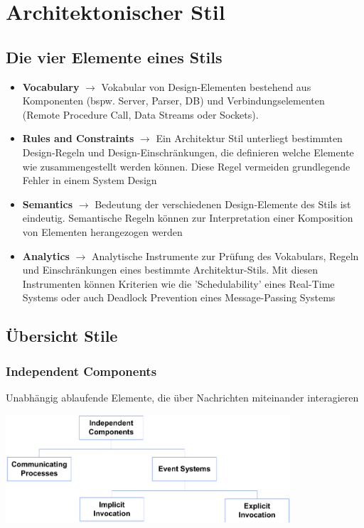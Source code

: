 \documentclass{report}
\newenvironment{Figure}
	{\par\medskip\noindent\minipage{\linewidth}}
	{\endminipage\par\medskip}
\theoremstyle{definition}
\theoremstyle{example}
\begin{document}
\section{Architektonischer Stil}

\subsection{Die vier Elemente eines Stils}
\begin{itemize}
	\item \textbf{Vocabulary} $\rightarrow$ Vokabular von Design-Elementen bestehend aus Komponenten (bspw. Server, Parser, DB) und Verbindungselementen (Remote Procedure Call, Data Streams oder Sockets).
	\item \textbf{Rules and Constraints} $\rightarrow$ Ein Architektur Stil unterliegt bestimmten Design-Regeln und Design-Einschränkungen, die definieren welche Elemente wie zusammengestellt werden können. Diese Regel vermeiden grundlegende Fehler in einem System Design
	\item \textbf{Semantics} $\rightarrow$ Bedeutung der verschiedenen Design-Elemente des Stils ist eindeutig. Semantische Regeln können zur Interpretation einer Komposition von Elementen herangezogen werden
	\item \textbf{Analytics} $\rightarrow$ Analytische Instrumente zur Prüfung des Vokabulars, Regeln und Einschränkungen eines bestimmte Architektur-Stils. Mit diesen Instrumenten können Kriterien wie die 'Schedulability' eines Real-Time Systems oder auch Deadlock Prevention eines Message-Passing Systems
\end{itemize}

\subsection{Übersicht Stile}

\subsubsection{Independent Components}
Unabhängig ablaufende Elemente, die über Nachrichten miteinander interagieren
\begin{Figure}
\centering
\includegraphics[width=400px]{img/IndependentComponents.png}
	\label{fig:Übersicht Independent Components}
\end{Figure}
\end{document}
